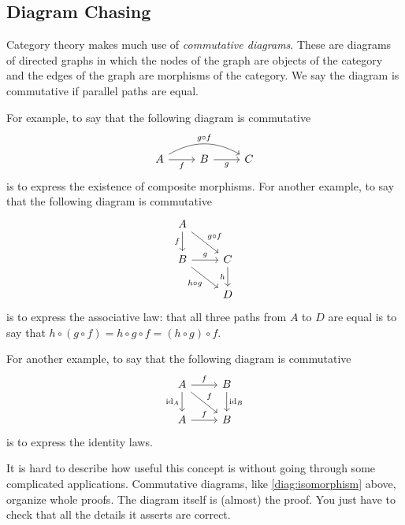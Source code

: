 \documentclass[11pt]{article}
\DeclareMathOperator{\idfun}{id}
\begin{document}
\subsection{Diagram Chasing}
\label{sec:diagram}

Category theory makes much use of \emph{commutative diagrams}.
These are diagrams of directed graphs in which the nodes of the graph
are objects of the category and the edges of the graph are morphisms
of the category.  We say the diagram is commutative if parallel paths
are equal.

For example, to say that the following diagram is commutative
\begin{equation}
\label{diag:composition}
\begin{tikzcd}
   A \rar[swap]{f} \arrow[rr, bend left, "g \circ f"] & B \rar[swap]{g} & C
\end{tikzcd}
\end{equation}
is to express the existence of composite morphisms.
For another example, to say that the following diagram is commutative
\begin{equation}
\label{diag:associative}
\begin{tikzcd}
    A \arrow{d}[swap]{f} \arrow{dr}{g \circ f} \\
    B \arrow{r}{g} \arrow{dr}[swap]{h \circ g} & C \arrow{d}[swap]{h} \\
    & D
\end{tikzcd}
\end{equation}
is to express the associative law: that all three paths from $A$ to $D$
are equal is to say that
$h \circ (g \circ f) = h \circ g \circ f = (h \circ g) \circ f$.

For another example, to say that the following diagram is commutative
\begin{equation}
\label{diag:identity}
\begin{tikzcd}
    A \arrow{r}{f} \arrow{d}[swap]{\idfun_A} \arrow{dr}{f} &
    B \arrow{d}{\idfun_B} \\
    A \arrow{r}{f} & B
\end{tikzcd}
\end{equation}
is to express the identity laws.

It is hard to describe how useful this concept is
without going through some complicated applications.
Commutative diagrams, like \eqref{diag:isomorphism} above,
organize whole proofs.  The diagram itself is (almost) the proof.
You just have to check that all the details it asserts are correct.
\end{document}
